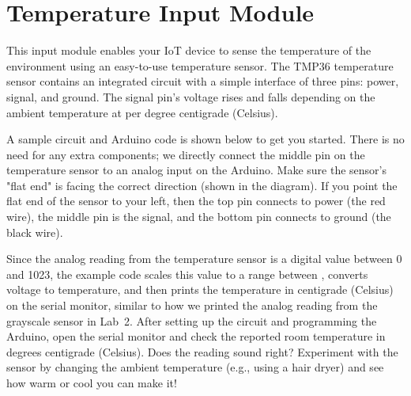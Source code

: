 
\clearpage
\section{Temperature Input Module}
\label{sec-input-temperature}


This input module enables your IoT device to sense the temperature of
the environment using an easy-to-use temperature sensor. The TMP36
temperature sensor contains an integrated circuit with a simple
interface of three pins: power, signal, and ground. The signal pin's
voltage rises and falls depending on the ambient temperature at
 per degree centigrade (Celsius).

A sample circuit and Arduino code is shown below to get you started.
There is no need for any extra components; we directly connect the
middle pin on the temperature sensor to an analog input on the Arduino.
Make sure the sensor's "flat end" is facing the correct direction (shown
in the diagram). If you point the flat end of the sensor to your left,
then the top pin connects to power (the red wire), the middle pin is the
signal, and the bottom pin connects to ground (the black wire).

Since the analog reading from the temperature sensor is a digital value
between 0 and 1023, the example code scales this value to a range
between , converts voltage to temperature, and then prints
the temperature in centigrade (Celsius) on the serial monitor, similar
to how we printed the analog reading from the grayscale sensor in Lab~2.
After setting up the circuit and programming the Arduino, open the
serial monitor and check the reported room temperature in degrees
centigrade (Celsius). Does the reading sound right? Experiment with the
sensor by changing the ambient temperature (e.g., using a hair dryer)
and see how warm or cool you can make it!

